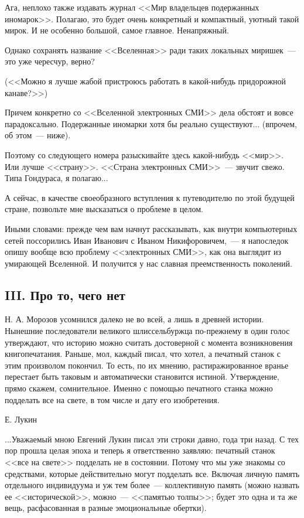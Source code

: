 \documentclass{scrbook}
\makeatletter
\newcommand{\bigepigraphwidth}{0.8} %
\newcommand{\defaultepigraphwidth}{0.5} %
\newcommand{\flqq}{<<}
\newcommand{\frqq}{>>}
\newcommand{\mdash}{~--- }
\newcommand{\commamdash}{~--- } %
\newcommand{\essaysection}[1]{\subsection*{#1}\nopagebreak}
\newcommand{\myepigraph}[3][\@empty]{
	\ifx\@empty#1
		\setlength{\epigraphwidth}{\defaultepigraphwidth\textwidth}
	\else
		\setlength{\epigraphwidth}{#1\textwidth}
	\fi
	\epigraph{#2}{#3}
	\setlength{\epigraphwidth}{\defaultepigraphwidth\textwidth} %
	\nopagebreak
}
\makeatother
\begin{document}
Ага, неплохо также издавать журнал {\flqq}Мир владельцев подержанных иномарок{\frqq}. Полагаю, это будет очень конкретный и компактный, уютный такой мирок. И не особенно большой, самое главное. Ненапряжный.

Однако сохранять название {\flqq}Вселенная{\frqq} ради таких локальных миришек{\mdash}это уже чересчур, верно?

({\flqq}Можно я лучше жабой пристроюсь работать в какой-нибудь придорожной канаве?{\frqq})

Причем конкретно со {\flqq}Вселенной электронных СМИ{\frqq} дела обстоят и вовсе парадоксально. Подержанные иномарки хотя бы реально существуют... (впрочем, об этом{\mdash}ниже).

Поэтому со следующего номера разыскивайте здесь какой-нибудь {\flqq}мир{\frqq}. Или лучше {\flqq}страну{\frqq}. {\flqq}Страна электронных СМИ{\frqq}{\mdash}звучит свежо. Типа Гондураса, я полагаю...

А сейчас, в качестве своеобразного вступления к путеводителю по этой будущей стране, позвольте мне высказаться о проблеме в целом.

Иными словами: прежде чем вам начнут рассказывать, как внутри компьютерных сетей поссорились Иван Иванович с Иваном Никифоровичем,{\commamdash}я напоследок опишу вообще всю проблему {\flqq}электронных СМИ{\frqq}, как она выглядит из умирающей Вселенной. И получится у нас славная преемственность поколений.

\essaysection{III. Про то, чего нет}

\myepigraph[\bigepigraphwidth]{Н. А. Морозов усомнился далеко не во всей, а лишь в древней истории. Нынешние последователи великого шлиссельбуржца по-прежнему в один голос утверждают, что историю можно считать достоверной с момента возникновения книгопечатания. Раньше, мол, каждый писал, что хотел, а печатный станок с этим произволом покончил. То есть, по их мнению, растиражированное вранье перестает быть таковым и автоматически становится истиной. Утверждение, прямо скажем, сомнительное. Именно с помощью печатного станка можно подделать все на свете, в том числе и дату его изобретения.}
{Е. Лукин}

...Уважаемый мною Евгений Лукин писал эти строки давно, года три назад. С тех пор прошла целая эпоха и теперь я ответственно заявляю: печатный станок {\flqq}все на свете{\frqq} подделать не в состоянии. Потому что мы уже знакомы со средствами, которые действительно могут подделать все. Включая личную память отдельного индивидуума и уж тем более{\mdash}коллективную память (можно назвать ее {\flqq}исторической{\frqq}, можно{\mdash}{\flqq}памятью толпы{\frqq}; будет это одна и та же вещь, расфасованная в разные эмоциональные обертки).
\end{document}
